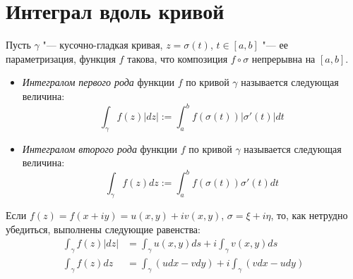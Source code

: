 \section{Интеграл вдоль кривой}

\begin{definition}
	Пусть $\gamma$ "--- кусочно-гладкая кривая, $z = \sigma(t)$, $t \in [a, b]$ "--- ее параметризация, функция $f$ такова, что композиция $f\circ\sigma$ непрерывна на $[a, b]$.
	\begin{itemize}
		\item \textit{Интегралом первого рода} функции $f$ по кривой $\gamma$ называется следующая величина:
		\[\int_{\gamma}f(z)|dz| := \int_a^bf(\sigma(t))|\sigma'(t)|dt\]
		\item \textit{Интегралом второго рода} функции $f$ по кривой $\gamma$ называется следующая величина:
		\[\int_{\gamma}f(z)dz := \int_a^bf(\sigma(t))\sigma'(t)dt\]
	\end{itemize}
\end{definition}

\begin{note}
	Если $f(z) = f(x + iy) = u(x, y) + iv(x, y)$, $\sigma = \xi + i\eta$, то, как нетрудно убедиться, выполнены следующие равенства:
	\begin{align*}
		\int_{\gamma}f(z)|dz| &= \int_\gamma u(x, y)ds + i\int_\gamma v(x, y)ds
		\\
		\int_{\gamma}f(z)dz &= \int_\gamma (udx - vdy) + i\int_\gamma (vdx - udy)
	\end{align*}
\end{note}

